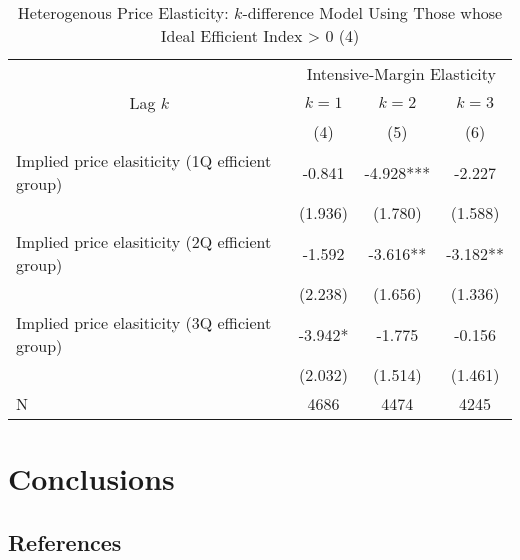 \documentclass[ review  , 3p ]{elsarticle}
\begin{document}
  \begin{table}

  \caption{\label{tab:kableSubsetHeterokDiffElasticitySlide4}Heterogenous Price Elasticity: $k$-difference Model Using Those whose Ideal Efficient Index > 0 (4)}
  \centering
  \fontsize{8}{10}\selectfont
  \begin{tabular}[t]{lccc}
  \toprule
  \multicolumn{1}{c}{ } & \multicolumn{3}{c}{Intensive-Margin Elasticity} \\
  \cmidrule(l{3pt}r{3pt}){2-4}
  \multicolumn{1}{c}{Lag $k$} & \multicolumn{1}{c}{$k = 1$} & \multicolumn{1}{c}{$k = 2$} & \multicolumn{1}{c}{$k = 3$} \\
  \cmidrule(l{3pt}r{3pt}){1-1} \cmidrule(l{3pt}r{3pt}){2-2} \cmidrule(l{3pt}r{3pt}){3-3} \cmidrule(l{3pt}r{3pt}){4-4}
   & (4) & (5) & (6)\\
  \midrule
  Implied price elasiticity (1Q efficient group) & -0.841 & -4.928*** & -2.227\\
   & (1.936) & (1.780) & (1.588)\\
  Implied price elasiticity (2Q efficient group) & -1.592 & -3.616** & -3.182**\\
   & (2.238) & (1.656) & (1.336)\\
  Implied price elasiticity (3Q efficient group) & -3.942* & -1.775 & -0.156\\
   & (2.032) & (1.514) & (1.461)\\
  N & 4686 & 4474 & 4245\\
  \bottomrule
  \end{tabular}
  \end{table}

  \hypertarget{conclusions}{%
  \section{Conclusions}\label{conclusions}}

  \hypertarget{references}{%
  \subsection*{References}\label{references}}
\end{document}
